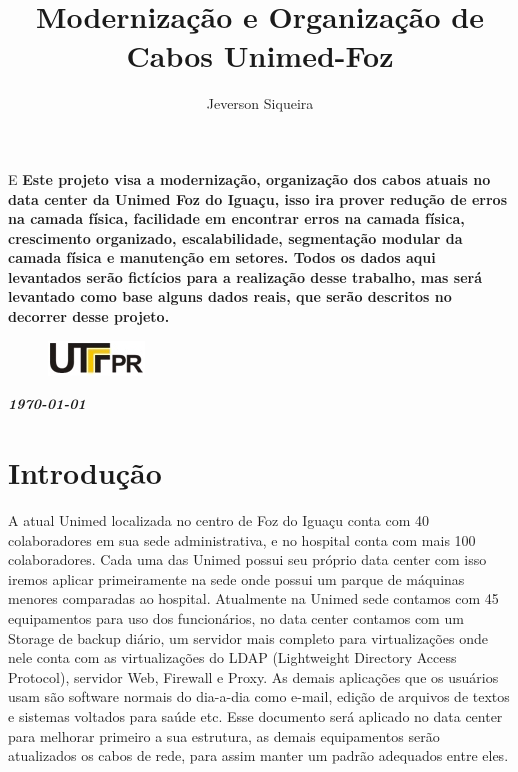 \documentclass[	DIV=calc,%
							paper=a4,%
							fontsize=12pt,%
							onecolumn]{scrartcl}	 					%
\title{Modernização e Organização de Cabos Unimed-Foz}					%
\author{Jeverson Siqueira}  	%
\date{}																				%
\newcommand{\initial}[1]{%
     \lettrine[lines=3,lhang=0.3,nindent=0em]{
     				\color{DarkGoldenrod}
     				{\textsf{#1}}}{}}
\begin{document}
\maketitle
\thispagestyle{fancy} 	
\thispagestyle{empty}		%




\initial{E}\textbf{
	Este projeto visa a modernização, organização dos cabos atuais no data center da Unimed Foz do Iguaçu, isso ira prover redução de erros na camada física, facilidade em encontrar erros na camada física, crescimento organizado, escalabilidade, segmentação modular da camada física e manutenção em setores. Todos os dados aqui levantados serão fictícios para a realização desse trabalho, mas será levantado como base alguns dados reais, que serão descritos no decorrer desse projeto. 
}

\begin{figure}
	\centering
	\includegraphics{utfpr}
\end{figure}

\vspace{3cm}
\centerline{\textit{\textbf{\today}}}





\clearpage
\renewcommand{\contentsname}{Sumário}
\tableofcontents
\clearpage

\section{Introdução}

A atual Unimed localizada no centro de Foz do Iguaçu conta com 40 colaboradores em sua sede administrativa, e no hospital conta com mais 100 colaboradores. Cada uma das Unimed possui seu próprio data center com isso iremos aplicar primeiramente na sede onde possui um parque de máquinas menores comparadas ao hospital. Atualmente na Unimed sede contamos com 45 equipamentos para uso dos funcionários, no data center contamos com um Storage de backup diário, um servidor mais completo para virtualizações onde nele conta com as virtualizações do LDAP (Lightweight Directory Access Protocol), servidor Web, Firewall e Proxy. As demais aplicações que os usuários usam são software normais do dia-a-dia como e-mail, edição de arquivos de textos e sistemas voltados para saúde etc. Esse documento será aplicado no data center para melhorar primeiro a sua estrutura, as demais equipamentos serão atualizados os cabos de rede, para assim manter um padrão adequados entre eles.
\end{document}
